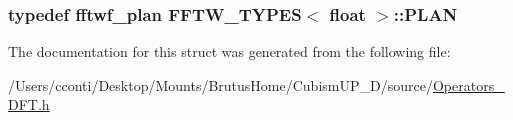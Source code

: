 \subsubsection[{P\+L\+A\+N}]{\setlength{\rightskip}{0pt plus 5cm}typedef fftwf\+\_\+plan {\bf F\+F\+T\+W\+\_\+\+T\+Y\+P\+E\+S}$<$ float $>$\+::{\bf P\+L\+A\+N}}\label{struct_f_f_t_w___t_y_p_e_s_3_01float_01_4_a564fe6a699a8574500c81d7d43b23980}


The documentation for this struct was generated from the following file\+:\begin{DoxyCompactItemize}
\item 
/\+Users/cconti/\+Desktop/\+Mounts/\+Brutus\+Home/\+Cubism\+U\+P\+\_\+D/source/\hyperlink{_operators___d_f_t_8h}{Operators\+\_\+\+D\+F\+T.\+h}\end{DoxyCompactItemize}
